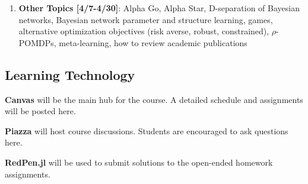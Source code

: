\documentclass[9pt]{article}
\begin{document}
\begin{enumerate}[noitemsep]
        \begin{multicols}{2}
        \begin{itemize}[noitemsep]
            \item Hidden Markov models
            \item Bayesian filters
            \item Particle filters
            \item Partially observable Markov decision processes (POMDPs)
            \item Exact POMDP methods
            \item Convexity of POMDP value functions
            \item Offline POMDP methods
            \item Online POMDP methods
            \item QMDP
        \end{itemize}
        \end{multicols}
    \item \textbf{Other Topics [4/7-4/30]}: Alpha Go, Alpha Star, D-separation of Bayesian networks, Bayesian network parameter and structure learning, games, alternative optimization objectives (risk averse, robust, constrained), $\rho$-POMDPs, meta-learning, how to review academic publications
\end{enumerate}

\begin{samepage}
\section*{Learning Technology}

\textbf{Canvas} will be the main hub for the course. A detailed schedule and assignments will be posted here.

\textbf{Piazza} will host course discussions. Students are encouraged to ask questions here.

\textbf{RedPen.jl} will be used to submit solutions to the open-ended homework assignments.
\end{samepage}
\\
\end{document}
